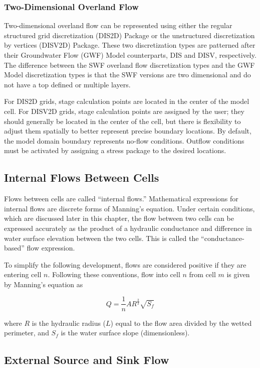 \documentclass[fleqn]{article}
\begin{document}
\subsubsection{Two-Dimensional Overland Flow}
Two-dimensional overland flow can be represented using either the regular structured grid discretization (DIS2D) Package or the unstructured discretization by vertices (DISV2D) Package.  These two discretization types are patterned after their Groundwater Flow (GWF) Model counterparts, DIS and DISV, respectively.  The difference between the SWF overland flow discretization types and the GWF Model discretization types is that the SWF versions are two dimensional and do not have a top defined or multiple layers.

For DIS2D grids, stage calculation points are located in the center of the model cell.  For DISV2D grids, stage calculation points are assigned by the user; they should generally be located in the center of the cell, but there is flexibility to adjust them spatially to better represent precise boundary locations.  By default, the model domain boundary represents no-flow conditions.  Outflow conditions must be activated by assigning a stress package to the desired locations.

\subsection{Internal Flows Between Cells}
Flows between cells are called ``internal flows.'' Mathematical expressions for internal flows are discrete forms of Manning's equation. Under certain conditions, which are discussed later in this chapter, the flow between two cells can be expressed accurately as the product of a hydraulic conductance and difference in water surface elevation between the two cells. This is called the ``conductance-based'' flow expression.

To simplify the following development, flows are considered positive if they are entering cell $n$. Following these conventions, flow into cell $n$ from cell $m$ is given by Manning's equation as

\begin{equation}
  Q = \frac{1}{n} A R^{\frac{2}{3}} \sqrt{S_f}
\end{equation}

\noindent where $R$ is the hydraulic radius ($L$) equal to the flow area divided by the wetted perimeter, and $S_f$ is the water surface slope (dimensionless). 

\subsection{External Source and Sink Flow}
\end{document}
